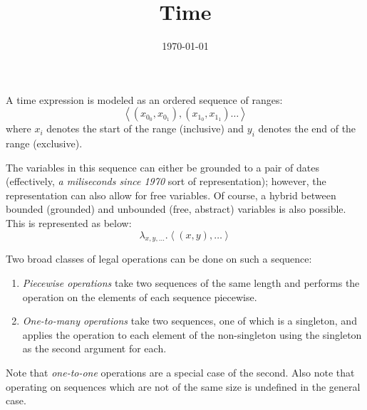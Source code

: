 \documentclass{article}
\begin{document}
\title{Time}
\author{}
\date{\today}
\maketitle

\def\second#1{\ensuremath{#1_{second}}}
\def\minute#1{\ensuremath{#1_{minute}}}
\def\hour#1{\ensuremath{#1_{hour}}}
\def\day#1{\ensuremath{#1_{day}}}
\def\week#1{\ensuremath{#1_{week}}}
\def\month#1{\ensuremath{#1_{month}}}
\def\quarter#1{\ensuremath{#1_{quarter}}}
\def\year#1{\ensuremath{#1_{year}}}
\def\sp{\hspace{5mm}}


A time expression is modeled as an ordered sequence of ranges:
\begin{equation*}
	\left< (x_{0_0}, x_{0_1}), (x_{1_0}, x_{1_1})\dots \right>
\end{equation*}
where $x_i$ denotes the start of the range (inclusive) and $y_i$ denotes
	the end of the range (exclusive).

The variables in this sequence can either be grounded to a pair of dates
	(effectively, {\em a miliseconds since 1970} sort of representation);
however, the representation can also allow for free variables.
Of course, a hybrid between bounded (grounded) and unbounded (free, abstract)
	variables is also possible.
This is represented as below:
\begin{equation*}
	\lambda_{x,y,\dots}
		. \left< (x, y), \dots \right>
\end{equation*}

Two broad classes of legal operations can be done on such a sequence:
\begin{enumerate}
	\item {\em Piecewise operations} take two sequences of the same length
		and performs the operation on the elements of each sequence piecewise.
	\item {\em One-to-many operations} take two sequences, one of which is
		a singleton, and applies the operation to each element of the non-singleton
		using the singleton as the second argument for each.
\end{enumerate}
Note that {\em one-to-one} operations are a special case of the second.
Also note that operating on sequences which are not of the same size is
	undefined in the general case.
\end{document}
